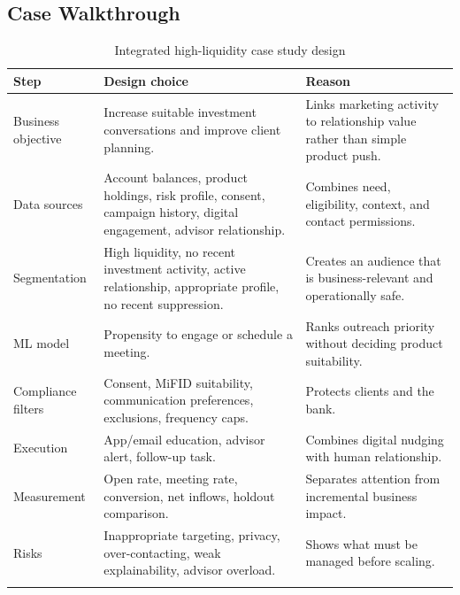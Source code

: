 \documentclass[
	11pt,
	fleqn,
	a4paper,
	oneside,
]{LegrandOrangeBook}
\begin{document}
\subsection{Case Walkthrough}

\begin{longtable}{L{0.24\textwidth} L{0.32\textwidth} L{0.34\textwidth}}
	\toprule
	\textbf{Step} & \textbf{Design choice} & \textbf{Reason}\\
	\midrule
	Business objective & Increase suitable investment conversations and improve client planning. & Links marketing activity to relationship value rather than simple product push.\\
	Data sources & Account balances, product holdings, risk profile, consent, campaign history, digital engagement, advisor relationship. & Combines need, eligibility, context, and contact permissions.\\
	Segmentation & High liquidity, no recent investment activity, active relationship, appropriate profile, no recent suppression. & Creates an audience that is business-relevant and operationally safe.\\
	ML model & Propensity to engage or schedule a meeting. & Ranks outreach priority without deciding product suitability.\\
	Compliance filters & Consent, MiFID suitability, communication preferences, exclusions, frequency caps. & Protects clients and the bank.\\
	Execution & App/email education, advisor alert, follow-up task. & Combines digital nudging with human relationship.\\
	Measurement & Open rate, meeting rate, conversion, net inflows, holdout comparison. & Separates attention from incremental business impact.\\
	Risks & Inappropriate targeting, privacy, over-contacting, weak explainability, advisor overload. & Shows what must be managed before scaling.\\
	\bottomrule
	\caption{Integrated high-liquidity case study design}
\end{longtable}
\end{document}
